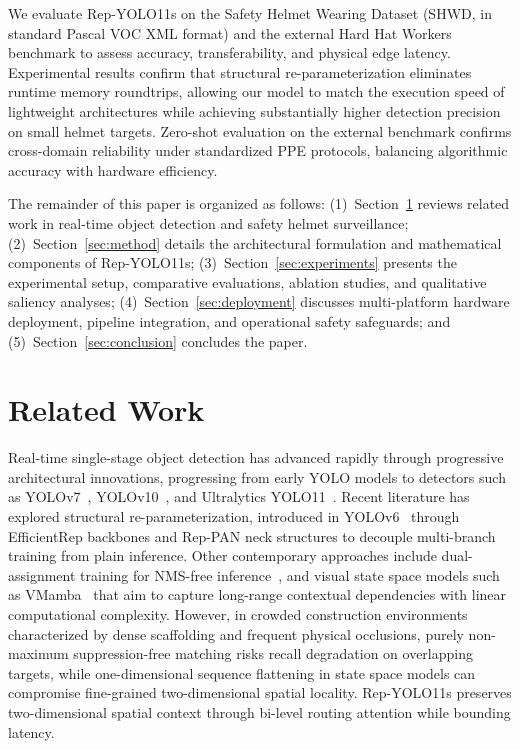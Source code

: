 \documentclass[conference]{IEEEtran}
\begin{document}
We evaluate Rep-YOLO11s on the Safety Helmet Wearing Dataset (SHWD, in standard Pascal VOC XML format) and the external Hard Hat Workers benchmark to assess accuracy, transferability, and physical edge latency. Experimental results confirm that structural re-parameterization eliminates runtime memory roundtrips, allowing our model to match the execution speed of lightweight architectures while achieving substantially higher detection precision on small helmet targets. Zero-shot evaluation on the external benchmark confirms cross-domain reliability under standardized PPE protocols, balancing algorithmic accuracy with hardware efficiency.

The remainder of this paper is organized as follows: (1)~Section~\ref{sec:related} reviews related work in real-time object detection and safety helmet surveillance; (2)~Section~\ref{sec:method} details the architectural formulation and mathematical components of Rep-YOLO11s; (3)~Section~\ref{sec:experiments} presents the experimental setup, comparative evaluations, ablation studies, and qualitative saliency analyses; (4)~Section~\ref{sec:deployment} discusses multi-platform hardware deployment, pipeline integration, and operational safety safeguards; and (5)~Section~\ref{sec:conclusion} concludes the paper.

\section{Related Work}
\label{sec:related}
Real-time single-stage object detection has advanced rapidly through progressive architectural innovations, progressing from early YOLO models to detectors such as YOLOv7~\cite{wang2023yolov7}, YOLOv10~\cite{wang2024yolov10}, and Ultralytics YOLO11~\cite{ultralytics2024yolo11}. Recent literature has explored structural re-parameterization, introduced in YOLOv6~\cite{li2023yolov6} through EfficientRep backbones and Rep-PAN neck structures to decouple multi-branch training from plain inference. Other contemporary approaches include dual-assignment training for NMS-free inference~\cite{wang2024yolov10,yolo26_2025}, and visual state space models such as VMamba~\cite{liu2024vmamba} that aim to capture long-range contextual dependencies with linear computational complexity. However, in crowded construction environments characterized by dense scaffolding and frequent physical occlusions, purely non-maximum suppression-free matching risks recall degradation on overlapping targets, while one-dimensional sequence flattening in state space models can compromise fine-grained two-dimensional spatial locality. Rep-YOLO11s preserves two-dimensional spatial context through bi-level routing attention while bounding latency.
\end{document}
